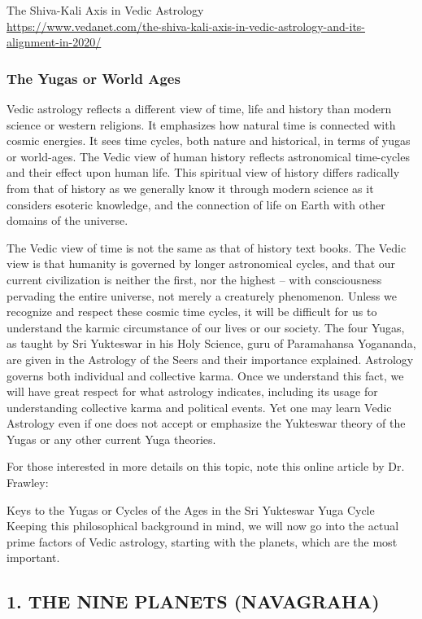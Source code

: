 The Shiva-Kali Axis in Vedic Astrology \\
 \url{https://www.vedanet.com/the-shiva-kali-axis-in-vedic-astrology-and-its-alignment-in-2020/}

\subsubsection{The Yugas or World Ages}
 

Vedic astrology reflects a different view of time, life and history than modern science or western religions. It emphasizes how natural time is connected with cosmic energies. It sees time cycles, both nature and historical, in terms of yugas or world-ages. The Vedic view of human history reflects astronomical time-cycles and their effect upon human life. This spiritual view of history differs radically from that of history as we generally know it through modern science as it considers esoteric knowledge, and the connection of life on Earth with other domains of the universe.

 

The Vedic view of time is not the same as that of history text books. The Vedic view is that humanity is governed by longer astronomical cycles, and that our current civilization is neither the first, nor the highest – with consciousness pervading the entire universe, not merely a creaturely phenomenon. Unless we recognize and respect these cosmic time cycles, it will be difficult for us to understand the karmic circumstance of our lives or our society. The four Yugas, as taught by Sri Yukteswar in his Holy Science, guru of Paramahansa Yogananda, are given in the Astrology of the Seers and their importance explained. Astrology governs both individual and collective karma. Once we understand this fact, we will have great respect for what astrology indicates, including its usage for understanding collective karma and political events. Yet one may learn Vedic Astrology even if one does not accept or emphasize the Yukteswar theory of the Yugas or any other current Yuga theories.

For those interested in more details on this topic, note this online article by Dr. Frawley:

Keys to the Yugas or Cycles of the Ages in the Sri Yukteswar Yuga Cycle
Keeping this philosophical background in mind, we will now go into the actual prime factors of Vedic astrology, starting with the planets, which are the most important.

 
\subsection{1. THE NINE PLANETS (NAVAGRAHA)}
 


